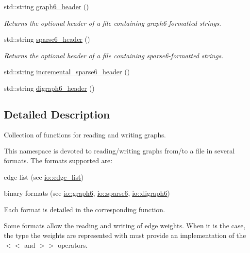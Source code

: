 \begin{DoxyCompactItemize}
std\+::string \hyperlink{namespacelgraph_1_1io_a4395b0de6f762686c4d20e475f0e2b0f}{graph6\+\_\+header} ()
\begin{DoxyCompactList}\small\item\em Returns the optional header of a file containing graph6-\/formatted strings. \end{DoxyCompactList}\item 
\mbox{\label{namespacelgraph_1_1io_ae84792a42d9b8e6f312635e00d774164}} 
std\+::string \hyperlink{namespacelgraph_1_1io_ae84792a42d9b8e6f312635e00d774164}{sparse6\+\_\+header} ()
\begin{DoxyCompactList}\small\item\em Returns the optional header of a file containing sparse6-\/formatted strings. \end{DoxyCompactList}\item 
std\+::string \hyperlink{namespacelgraph_1_1io_a22c81bcdaaa74ddd2651a92fde479c61}{incremental\+\_\+sparse6\+\_\+header} ()
\item 
std\+::string \hyperlink{namespacelgraph_1_1io_a045d4701d064cd1f3be3775c3edad35f}{digraph6\+\_\+header} ()
\end{DoxyCompactItemize}


\subsection{Detailed Description}
Collection of functions for reading and writing graphs. 

This namespace is devoted to reading/writing graphs from/to a file in several formats. The formats supported are\+:


\begin{DoxyItemize}
\item edge list (see \hyperlink{namespacelgraph_1_1io_1_1edge__list}{io\+::edge\+\_\+list})
\item binary formats (see \hyperlink{namespacelgraph_1_1io_1_1graph6}{io\+::graph6}, \hyperlink{namespacelgraph_1_1io_1_1sparse6}{io\+::sparse6}, \hyperlink{namespacelgraph_1_1io_1_1digraph6}{io\+::digraph6})
\end{DoxyItemize}

Each format is detailed in the corresponding function.

Some formats allow the reading and writing of edge weights. When it is the case, the type the weights are represented with must provide an implementation of the \textquotesingle{}$<$$<$\textquotesingle{} and \textquotesingle{}$>$$>$\textquotesingle{} operators.

